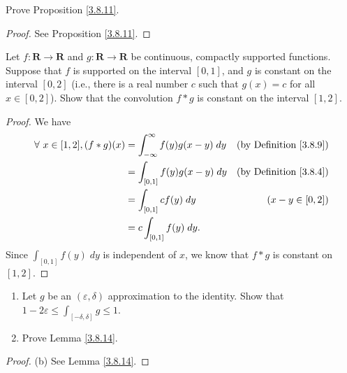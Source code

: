 \begin{exercise}\label{ex 3.8.4}
    Prove Proposition \ref{3.8.11}.
\end{exercise}

\begin{proof}
    See Proposition \ref{3.8.11}.
\end{proof}

\begin{exercise}\label{ex 3.8.5}
    Let \(f : \mathbf{R} \to \mathbf{R}\) and \(g : \mathbf{R} \to \mathbf{R}\) be continuous, compactly supported functions.
    Suppose that \(f\) is supported on the interval \([0, 1]\), and \(g\) is constant on the interval \([0, 2]\)
    (i.e., there is a real number \(c\) such that \(g(x) = c\) for all \(x \in [0, 2]\)).
    Show that the convolution \(f * g\) is constant on the interval \([1, 2]\).
\end{exercise}

\begin{proof}
    We have
    \begin{align*}
        \forall\ x \in [1, 2], (f * g)(x) & = \int_{-\infty}^\infty f(y) g(x - y) \; dy & \text{(by Definition \ref{3.8.9})} \\
                                          & = \int_{[0, 1]} f(y) g(x - y) \; dy         & \text{(by Definition \ref{3.8.4})} \\
                                          & = \int_{[0, 1]} c f(y) \; dy                & (x - y \in [0, 2])                 \\
                                          & = c \int_{[0, 1]} f(y) \; dy.
    \end{align*}
    Since \(\int_{[0, 1]} f(y) \; dy\) is independent of \(x\), we know that \(f * g\) is constant on \([1, 2]\).
\end{proof}

\begin{exercise}\label{ex 3.8.6}
    \quad
    \begin{enumerate}
        \item Let \(g\) be an \((\varepsilon, \delta)\) approximation to the identity.
              Show that \(1 - 2 \varepsilon \leq \int_{[-\delta, \delta]} g \leq 1\).
        \item Prove Lemma \ref{3.8.14}.
    \end{enumerate}
\end{exercise}

\begin{proof}{(b)}
    See Lemma \ref{3.8.14}.
\end{proof}

